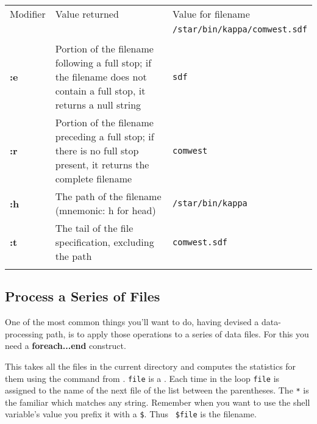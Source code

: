 \documentclass[twoside,11pt,nolof]{starlink}
\providecommand{\KAPPAref}{\xref{{\footnotesize KAPPA}}{sun95}{}}
\begin{document}
\begin{center}
\begin{tabular}{lp{62mm}l}
Modifier & Value returned & Value for filename \\
 & & \texttt{/star/bin/kappa/comwest.sdf} \\ \hline
\\
\textbf{:e} & Portion of the filename following a full stop; if the filename does
not contain a full stop, it returns a null string & \texttt{sdf} \\
\textbf{:r} & Portion of the filename preceding a full stop; if there is no full stop
present, it returns the complete filename & \texttt{comwest} \\
\textbf{:h} & The path of the filename (mnemonic: h for head) & \texttt{/star/bin/kappa} \\
\textbf{:t} & The tail of the file specification, excluding the path &
                                         \texttt{comwest.sdf} \\
\\ \hline
\end{tabular}
\end{center}
\medskip

\newpage
\subsection{Process a Series of Files
\label{sc4_se_series_files}}

One of the most common things you'll want to do, having devised
a data-processing path, is to apply those operations to a series
of data files.   For this you need a \textbf{foreach...end} construct.

\begin{small}
\end{small}
This takes all the  files in the
current directory and computes the statistics for them using the
 command from \KAPPAref\normalsize\@.  \texttt{file}
is a .  Each time in the
loop \texttt{file} is assigned to the name of the next file of the list
between the parentheses.  The \texttt{*} is the familiar
 which
matches any string.  Remember when you want to use the shell
variable's value you prefix it with a \texttt{\$}.  Thus {\tt
\$file} is the filename.
\end{document}

